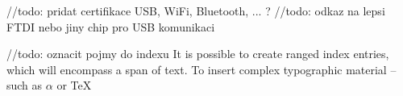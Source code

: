 \documentclass[
  digital, %
  table,   %
  lof,     %
  lot,     %
]{fithesis3}
\begin{document}


//todo: pridat certifikace USB, WiFi, Bluetooth, ... ?
//todo: odkaz na lepsi FTDI nebo jiny chip pro USB komunikaci











//todo: oznacit pojmy do indexu
It is possible to create ranged index
entries, which will encompass a span of text.
To insert complex typographic material -- such as $\alpha$
 or \TeX{}  

\printbibliography[heading=bibintoc] %

\makeatletter\thesis@blocks@clear\makeatother
{}
\printindex

\appendix

\end{document}
